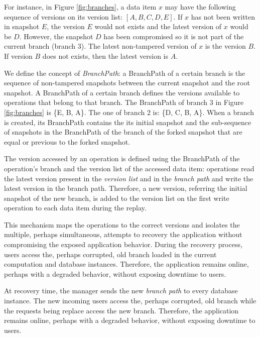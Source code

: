 For instance, in Figure \ref{fig:branches}, a data item $x$ may have the following sequence of versions on its version list: $[A,B,C,D,E]$. If $x$ has not been written in snapshot $E$, the version $E$ would not exists and the latest version of $x$ would be $D$. However, the snapshot $D$ has been compromised so it is not part of the current branch (branch 3). The latest non-tampered version of $x$ is the version $B$. If version $B$ does not exists, then the latest version is $A$.

We define the concept of \emph{BranchPath}: a BranchPath of a certain branch is the sequence of non-tampered snapshots between the current snapshot and the root snapshot. A BranchPath of a certain branch defines the versions available to operations that belong to that branch. The BranchPath of branch $3$ in Figure \ref{fig:branches} is \{E, B, A\}. The one of branch $2$ is: \{D, C, B, A\}. When a branch is created, its BranchPath contains the its initial snapshot and the sub-sequence of snapshots in the BranchPath of the branch of the forked snapshot that are equal or previous to the forked snapshot.

The version accessed by an operation is defined using the BranchPath of the operation's branch and the version list of the accessed data item: operations read the latest version present in the \emph{version list} and in the \emph{branch path} and write the latest version in the branch path. Therefore, a new version, referring the initial snapshot of the new branch, is added to the version list on the first write operation to each data item during the replay.

This mechanism maps the operations to the correct versions and isolates the multiple, perhaps simultaneous, attempts to recovery the application without compromising the exposed application behavior. During the recovery process, users access the, perhaps corrupted, old branch loaded in the current computation and database instances. Therefore, the application remains online, perhaps with a degraded behavior, without exposing downtime to users.

At recovery time, the manager sends the new \emph{branch path} to every database instance. The new incoming users access the, perhaps corrupted, old branch while the requests being replace access the new branch. Therefore, the application remains online, perhaps with a degraded behavior, without exposing downtime to users. 

